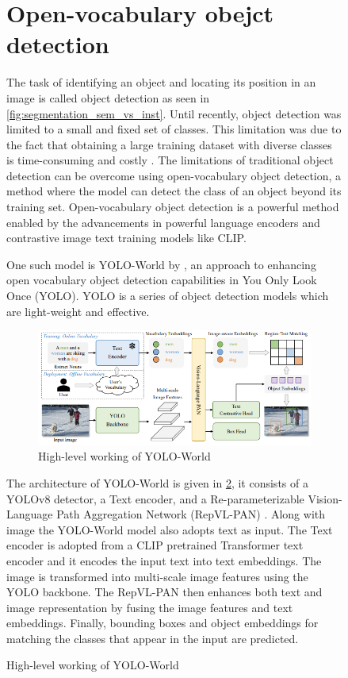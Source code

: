 \begin{figure}[ht!]
\section{Open-vocabulary obejct detection}
The task of identifying an object and locating its position in an image is called object detection as seen in \cref{fig:segmentation_sem_vs_inst}. Until recently, object detection was limited to a small and fixed
set of classes. This limitation was due to the fact that obtaining a large training dataset with diverse classes is time-consuming and costly \cite{10.1007/978-3-031-20080-9_42}. 
The limitations of traditional object detection can be overcome using open-vocabulary object detection, a method where the model can detect the class of an 
object beyond its training set. Open-vocabulary object detection is a powerful method enabled by the advancements in powerful language encoders 
and contrastive image text training models like CLIP. 

One such model is YOLO-World by \citet{cheng2024yolow}, an approach to enhancing open vocabulary object detection capabilities in You Only Look Once (YOLO).
YOLO is a series of object detection models which are light-weight and effective. 
\begin{figure}[ht!]
    \centering
    \includegraphics[width=\textwidth]{content/images/YOLOWorld.png}
    \caption{High-level working of YOLO-World \cite{cheng2024yolow}}
    \label{fig:yolo}
\end{figure}

The architecture of YOLO-World is given in \cref{fig:yolo}, it consists of a YOLOv8 detector, a Text encoder, and a Re-parameterizable Vision-Language
Path Aggregation Network (RepVL-PAN) \cite{cheng2024yolow}. Along with image the YOLO-World model also adopts text as input. The Text encoder is adopted
from a CLIP pretrained Transformer text encoder and it encodes the input text into text embeddings. The image is transformed into multi-scale image features using the 
YOLO backbone. The RepVL-PAN then enhances both text and image representation by fusing the image features and text embeddings. Finally, bounding boxes and object 
embeddings for matching the classes that appear in the input are predicted.


\end{figure}

